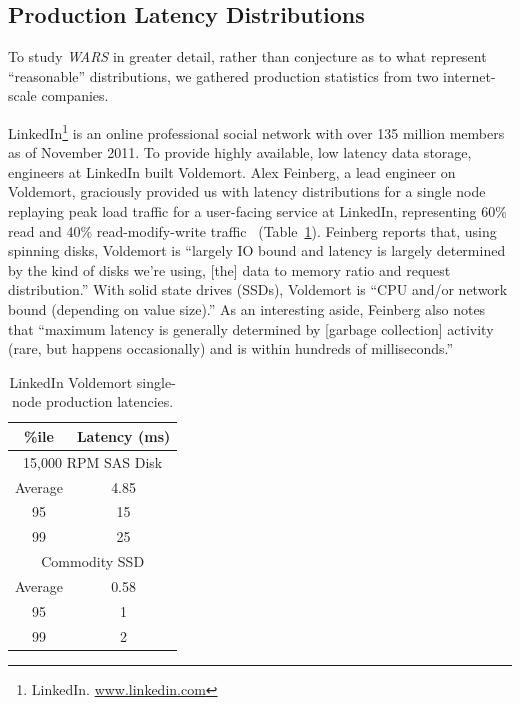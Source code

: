 \documentclass{vldb}
\newcommand{\subsectionskip}{-0em}
\begin{document}
\vspace{\subsectionskip}\subsection{Production Latency Distributions}
\label{sec:latencies}

To study \textit{WARS} in greater detail, rather than conjecture as to
what represent ``reasonable'' distributions, we gathered production
statistics from two internet-scale companies.

LinkedIn\footnote{LinkedIn. \url{www.linkedin.com}} is an online
professional social network with over 135 million members as of
November 2011. To provide highly available, low latency data storage,
engineers at LinkedIn built Voldemort.  Alex Feinberg, a lead engineer
on Voldemort, graciously provided us with latency distributions for a
single node replaying peak load traffic for a user-facing service at
LinkedIn, representing 60\% read and 40\% read-modify-write
traffic~\cite{feinbergpc} (Table~\ref{table:linkedin}).  Feinberg
reports that, using spinning disks, Voldemort is ``largely IO bound
and latency is largely determined by the kind of disks we're using,
[the] data to memory ratio and request distribution.''  With solid
state drives (SSDs), Voldemort is ``CPU and/or network bound
(depending on value size).''  As an interesting aside, Feinberg also
notes that ``maximum latency is generally determined by [garbage
  collection] activity (rare, but happens occasionally) and is within
hundreds of milliseconds.''

\begin{table}
\centering
\begin{tabular}{|c|c|}
\hline
\%ile & Latency (ms) \\
\hline
\multicolumn{2}{|c|}{ 15,000 RPM SAS Disk}\\
\hline
Average & 4.85\\
95 & 15\\
99 & 25\\
\hline
\multicolumn{2}{|c|}{ Commodity SSD }\\
\hline
Average & 0.58 \\
95 & 1\\
99 & 2\\
\hline
\end{tabular}
\vspace{-6pt}
\caption{LinkedIn Voldemort single-node production latencies.}
\vspace{-12pt}
\label{table:linkedin}
\end{table}
\end{document}
